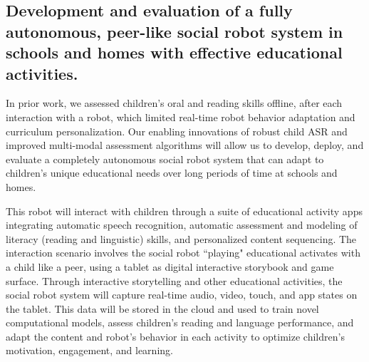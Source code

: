 
\subsection {Development and evaluation of a fully autonomous, peer-like social robot system in schools and homes with effective educational activities.}

In prior work, we assessed children's oral and reading skills offline, after each interaction with a robot, which limited real-time robot behavior adaptation and curriculum personalization. Our enabling innovations of robust child ASR and improved multi-modal assessment algorithms will allow us to develop, deploy, and evaluate a completely autonomous social robot system that can adapt to children's unique educational needs over long periods of time at schools and homes. 

This robot will interact with children through a suite of educational activity apps integrating automatic speech recognition, automatic assessment and modeling of literacy (reading and linguistic) skills, and personalized content sequencing. The interaction scenario involves the social robot ``playing" educational activates with a child like a peer, using a tablet as digital interactive storybook and game surface. Through interactive storytelling and other educational activities, the social robot system will capture real-time audio, video, touch, and app states on the tablet. This data will be stored in the cloud and used to train novel computational models, assess children's reading and language performance, and adapt the content and robot's behavior in each activity to optimize children's motivation, engagement, and learning. 


